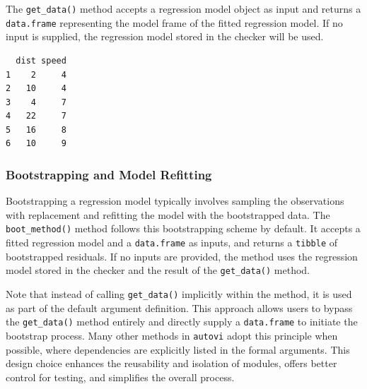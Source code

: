 \documentclass[
doublespace,
  times]{anzsauth}
\newenvironment{Shaded}{\begin{snugshade}}{\end{snugshade}}
\newcommand{\AttributeTok}[1]{\textcolor[rgb]{0.40,0.45,0.13}{#1}}
\newcommand{\FunctionTok}[1]{\textcolor[rgb]{0.28,0.35,0.67}{#1}}
\newcommand{\NormalTok}[1]{\textcolor[rgb]{0.00,0.23,0.31}{#1}}
\newcommand{\SpecialCharTok}[1]{\textcolor[rgb]{0.37,0.37,0.37}{#1}}
\begin{document}
The \texttt{get\_data()} method accepts a regression model object as
input and returns a \texttt{data.frame} representing the model frame of
the fitted regression model. If no input is supplied, the regression
model stored in the checker will be used.

\begin{Shaded}
\end{Shaded}

\begin{verbatim}
  dist speed
1    2     4
2   10     4
3    4     7
4   22     7
5   16     8
6   10     9
\end{verbatim}

\subsubsection{Bootstrapping and Model
Refitting}\label{bootstrapping-and-model-refitting}

Bootstrapping a regression model typically involves sampling the
observations with replacement and refitting the model with the
bootstrapped data. The \texttt{boot\_method()} method follows this
bootstrapping scheme by default. It accepts a fitted regression model
and a \texttt{data.frame} as inputs, and returns a \texttt{tibble} of
bootstrapped residuals. If no inputs are provided, the method uses the
regression model stored in the checker and the result of the
\texttt{get\_data()} method.

Note that instead of calling \texttt{get\_data()} implicitly within the
method, it is used as part of the default argument definition. This
approach allows users to bypass the \texttt{get\_data()} method entirely
and directly supply a \texttt{data.frame} to initiate the bootstrap
process. Many other methods in \texttt{autovi} adopt this principle when
possible, where dependencies are explicitly listed in the formal
arguments. This design choice enhances the reusability and isolation of
modules, offers better control for testing, and simplifies the overall
process.

\begin{Shaded}
\end{Shaded}
\end{document}
